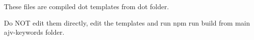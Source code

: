 These files are compiled dot templates from dot folder.

Do N\+OT edit them directly, edit the templates and run {\ttfamily npm run build} from main ajv-\/keywords folder. 